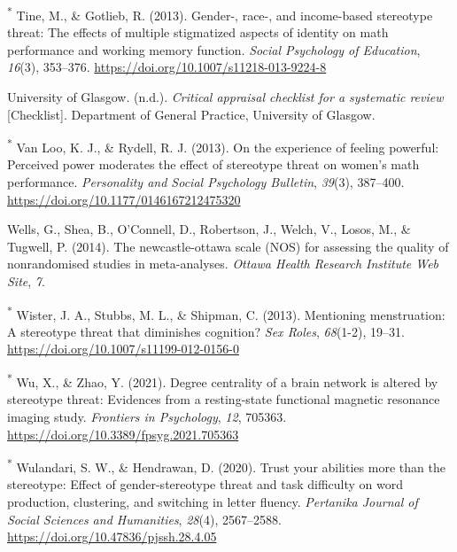 \documentclass[
  stu,floatsintext]{apa7}
\newlength{\cslhangindent}
\newenvironment{CSLReferences}[2] %
 {\begin{list}{}{%
  \setlength{\itemindent}{0pt}
  \setlength{\leftmargin}{0pt}
  \setlength{\parsep}{0pt}
  \ifodd #1
   \setlength{\leftmargin}{\cslhangindent}
   \setlength{\itemindent}{-1\cslhangindent}
  \fi
  \setlength{\itemsep}{#2\baselineskip}}}
 {\end{list}}
\begin{document}
\begin{CSLReferences}{1}{0}
\textsuperscript{*} Tine, M., \& Gotlieb, R. (2013). Gender-, race-, and income-based stereotype threat: The effects of multiple stigmatized aspects of identity on math performance and working memory function. \emph{Social Psychology of Education}, \emph{16}(3), 353--376. \url{https://doi.org/10.1007/s11218-013-9224-8}

University of Glasgow. (n.d.). \emph{Critical appraisal checklist for a systematic review} {[}Checklist{]}. Department of General Practice, University of Glasgow.

\textsuperscript{*} Van Loo, K. J., \& Rydell, R. J. (2013). On the experience of feeling powerful: {Perceived} power moderates the effect of stereotype threat on women's math performance. \emph{Personality and Social Psychology Bulletin}, \emph{39}(3), 387--400. \url{https://doi.org/10.1177/0146167212475320}

Wells, G., Shea, B., O'Connell, D., Robertson, J., Welch, V., Losos, M., \& Tugwell, P. (2014). The newcastle-ottawa scale ({NOS}) for assessing the quality of nonrandomised studies in meta-analyses. \emph{Ottawa Health Research Institute Web Site}, \emph{7}.

\textsuperscript{*} Wister, J. A., Stubbs, M. L., \& Shipman, C. (2013). Mentioning menstruation: A stereotype threat that diminishes cognition? \emph{Sex Roles}, \emph{68}(1-2), 19--31. \url{https://doi.org/10.1007/s11199-012-0156-0}

\textsuperscript{*} Wu, X., \& Zhao, Y. (2021). Degree centrality of a brain network is altered by stereotype threat: {Evidences} from a resting-state functional magnetic resonance imaging study. \emph{Frontiers in Psychology}, \emph{12}, 705363. \url{https://doi.org/10.3389/fpsyg.2021.705363}

\textsuperscript{*} Wulandari, S. W., \& Hendrawan, D. (2020). Trust your abilities more than the stereotype: {Effect} of gender-stereotype threat and task difficulty on word production, clustering, and switching in letter fluency. \emph{Pertanika Journal of Social Sciences and Humanities}, \emph{28}(4), 2567--2588. \url{https://doi.org/10.47836/pjssh.28.4.05}


\end{CSLReferences}
\end{document}
